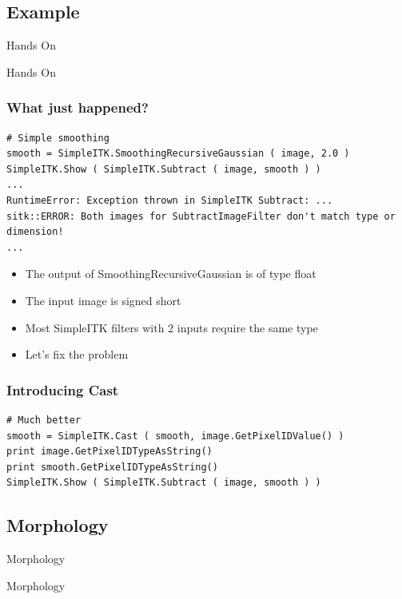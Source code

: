 \subsection{Example}
\begin{frame}{Hands On}
\fontsize{36pt}{36pt}\selectfont
\center
\begin{center}
Hands On
\end{center}
\end{frame}

\begin{frame}[fragile]
\frametitle{What just happened?}
\lstpython
\begin{lstlisting}
# Simple smoothing
smooth = SimpleITK.SmoothingRecursiveGaussian ( image, 2.0 )
SimpleITK.Show ( SimpleITK.Subtract ( image, smooth ) )
...
RuntimeError: Exception thrown in SimpleITK Subtract: ...
sitk::ERROR: Both images for SubtractImageFilter don't match type or dimension!
...
\end{lstlisting}

\begin{itemize}
  \item The output of SmoothingRecursiveGaussian is of type float
  \item The input image is signed short
  \item Most SimpleITK filters with 2 inputs require the same type
  \item Let's fix the problem
\end{itemize}

\end{frame}

\begin{frame}[fragile]
\frametitle{Introducing Cast}
\lstpython
\begin{lstlisting}
# Much better
smooth = SimpleITK.Cast ( smooth, image.GetPixelIDValue() )
print image.GetPixelIDTypeAsString()
print smooth.GetPixelIDTypeAsString()
SimpleITK.Show ( SimpleITK.Subtract ( image, smooth ) )
\end{lstlisting}
\end{frame}

\subsection{Morphology}

\begin{frame}{Morphology}
\fontsize{36pt}{36pt}\selectfont
\center
\begin{center}
Morphology
\end{center}
\end{frame}

